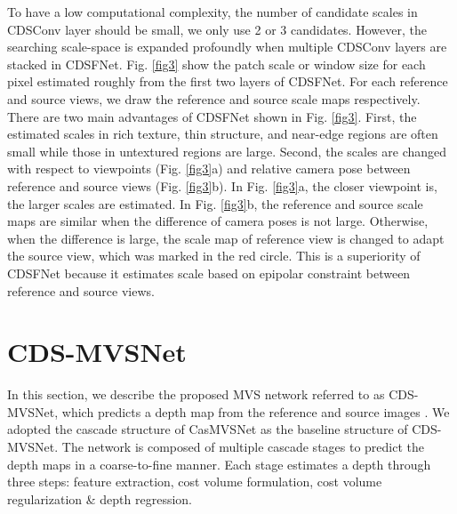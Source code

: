 \documentclass{article} \usepackage{iclr2022_conference,times}
\begin{document}
To have a low computational complexity, the number of candidate scales in CDSConv layer should be small, we only use 2 or 3 candidates. However, the searching scale-space is expanded profoundly when multiple CDSConv layers are stacked in CDSFNet. Fig. \ref{fig3} show the patch scale or window size for each pixel estimated roughly from the first two layers of CDSFNet. For each reference and source views, we draw the reference and source scale maps respectively. There are two main advantages of CDSFNet shown in Fig. \ref{fig3}. First, the estimated scales in rich texture, thin structure, and near-edge regions are often small while those in untextured regions are large. Second, the scales are changed with respect to viewpoints (Fig. \ref{fig3}a) and relative camera pose between reference and source views (Fig. \ref{fig3}b). In Fig. \ref{fig3}a, the closer viewpoint is, the larger scales are estimated. In Fig. \ref{fig3}b, the reference and source scale maps are similar when the difference of camera poses is not large. Otherwise, when the difference is large, the scale map of reference view is changed to adapt the source view, which was marked in the red circle. This is a superiority of CDSFNet because it estimates scale based on epipolar constraint between reference and source views. 

\section{CDS-MVSNet}
In this section, we describe the proposed MVS network referred to as CDS-MVSNet, which predicts a depth map  from the reference  and  source images . We adopted the cascade structure of CasMVSNet \citep{gu2020cascade} as the baseline structure of CDS-MVSNet. The network is composed of multiple cascade stages to predict the depth maps in a coarse-to-fine manner. Each stage estimates a depth through three steps: feature extraction, cost volume formulation, cost volume regularization \& depth regression. 
\end{document}
